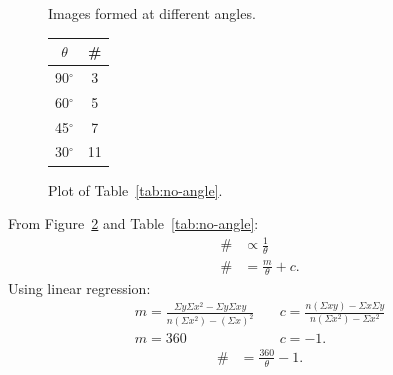 \documentclass{zc-ust-hw}
\begin{document}
\begin{enumerate}
\begin{figure}[htpb]
      \caption{Images formed at different angles.}
      \label{fig:images}
    \end{figure}

    \newpage

    \begin{figure}[t]
      \begin{minipage}{0.5\textwidth}  %
        \centering
        \begin{tabular}{|c|c|}
          \hline
          $\theta$ & \# \\
          \hline
          90$^\circ$ & 3 \\
          \hline
          60$^\circ$ & 5 \\
          \hline
          45$^\circ$ & 7 \\
          \hline
          30$^\circ$ & 11 \\
          \hline
        \end{tabular}
        \label{tab:no-angle}
      \end{minipage}%
      \begin{minipage}{0.5\textwidth}  %
        \centering
        \caption{Plot of Table~\ref{tab:no-angle}.}
        \label{fig:plot}
      \end{minipage}
    \end{figure}

    From Figure~\ref{fig:plot} and Table~\ref{tab:no-angle}:
    \begin{align}
      \# &\propto \frac{1}{\theta} \\
      \# &= \frac{m}{\theta} + c
    .\end{align}
    Using linear regression:
    \begin{align}
      m = \frac{\Sigma y \Sigma x^2-\Sigma y \Sigma xy}{n\left( \Sigma x^2 \right) - \left( \Sigma x \right)^2 } &\quad
      c = \frac{n\left( \Sigma xy \right) - \Sigma x\Sigma y}{n\left( \Sigma x^2 \right) - \Sigma x^2 } \\
      m = 360 &\quad c = -1
    .\end{align}
    \begin{align}
      \# &= \frac{360}{\theta} - 1 \label{eq:final}
    .\end{align}


\end{enumerate}
\end{document}
